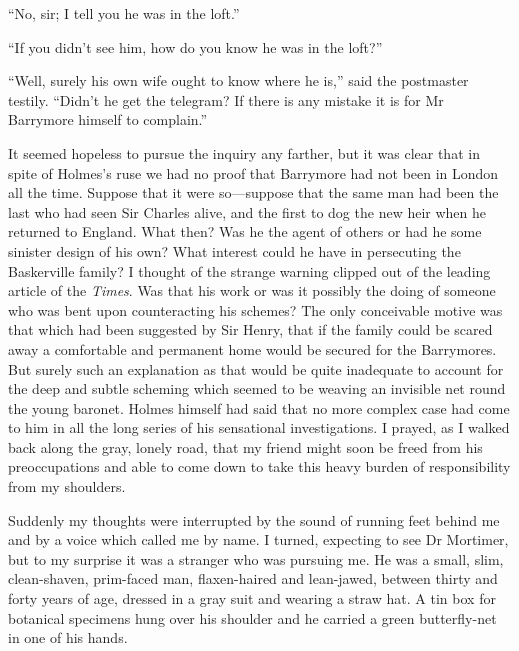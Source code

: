 \documentclass[paper=5.5in:8.5in,BCOR=7mm,twoside,DIV=calc,12pt,usegeometry,openany,chapterprefix,endperiod,headings=big]{scrbook} %
\begin{document}
\enquote{No, sir; I tell you he was in the loft.}

\enquote{If you didn't see him, how do you know he was in the loft?}

\enquote{Well, surely his own wife ought to know where he is,} said the postmaster testily. \enquote{Didn't he get the telegram? If there is any mistake it is for Mr Barrymore himself to complain.}

It seemed hopeless to pursue the inquiry any farther, but it was clear that in spite of Holmes's ruse we had no proof that Barrymore had not been in London all the time. Suppose that it were so---suppose that the same man had been the last who had seen Sir Charles alive, and the first to dog the new heir when he returned to England. What then? Was he the agent of others or had he some sinister design of his own? What interest could he have in persecuting the Baskerville family? I thought of the strange warning clipped out of the leading article of the \textit{Times}. Was that his work or was it possibly the doing of someone who was bent upon counteracting his schemes? The only conceivable motive was that which had been suggested by Sir Henry, that if the family could be scared away a comfortable and permanent home would be secured for the Barrymores. But surely such an explanation as that would be quite inadequate to account for the deep and subtle scheming which seemed to be weaving an invisible net round the young baronet. Holmes himself had said that no more complex case had come to him in all the long series of his sensational investigations. I prayed, as I walked back along the gray, lonely road, that my friend might soon be freed from his preoccupations and able to come down to take this heavy burden of responsibility from my shoulders.

Suddenly my thoughts were interrupted by the sound of running feet behind me and by a voice which called me by name. I turned, expecting to see Dr Mortimer, but to my surprise it was a stranger who was pursuing me. He was a small, slim, clean-shaven, prim-faced man, flaxen-haired and lean-jawed, between thirty and forty years of age, dressed in a gray suit and wearing a straw hat. A tin box for botanical specimens hung over his shoulder and he carried a green butterfly-net in one of his hands.
\end{document}
